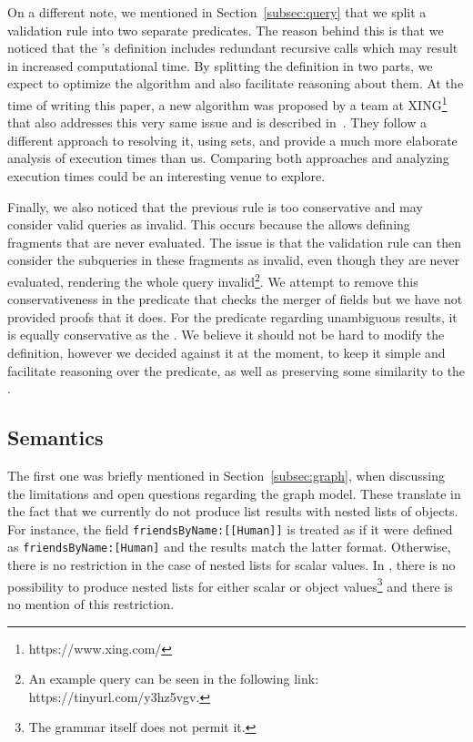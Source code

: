 On a different note, we mentioned in Section~\ref{subsec:query} that we split a validation rule into two separate predicates. The reason behind this is that we noticed that the \spec{}'s definition includes redundant recursive calls which may result in increased computational time. By splitting the definition in two parts, we expect to optimize the algorithm and also facilitate reasoning about them. At the time of writing this paper, a new algorithm was proposed by a team at XING\footnote{https://www.xing.com/} that also addresses this very same issue and is described in~\cite{xingalg}. They follow a different approach to resolving it, using sets, and provide a much more elaborate analysis of execution times than us. Comparing both approaches and analyzing execution times could be an interesting venue to explore.


Finally, we also noticed that the previous rule is too conservative and may consider valid queries as invalid. This occurs because the \spec{} allows defining fragments that are never evaluated. The issue is that the validation rule can then consider the subqueries in these fragments as invalid, even though they are never evaluated, rendering the whole query invalid\footnote{An example query can be seen in the following link: https://tinyurl.com/y3hz5vgv.}. We attempt to remove this conservativeness in the predicate that checks the merger of fields but we have not provided proofs that it does. For the predicate regarding unambiguous results, it is equally conservative as the \spec{}. We believe it should not be hard to modify the definition, however we decided against it at the moment, to keep it simple and facilitate reasoning over the predicate, as well as preserving some similarity to the \spec{}.


\subsection{Semantics}


The first one was briefly mentioned in Section~\ref{subsec:graph}, when discussing the limitations and open questions regarding the graph model. These translate in the fact that we currently do not produce list results with nested lists of objects. For instance, the field \texttt{friendsByName:[[Human]]} is treated as if it were defined as \texttt{friendsByName:[Human]} and the results match the latter format. Otherwise, there is no restriction in the case of nested lists for scalar values. In \HP{}, there is no possibility to produce nested lists for either scalar or object values\footnote{The grammar itself does not permit it.} and there is no mention of this restriction.

